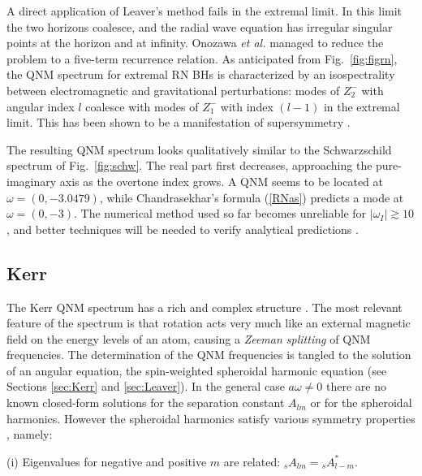 \documentclass[]{iopart}
\begin{document}
A direct application of Leaver's method fails in the extremal limit. In this
limit the two horizons coalesce, and the radial wave equation has irregular
singular points at the horizon and at infinity. Onozawa {\it et al.}
\cite{Onozawa:1995vu} managed to reduce the problem to a five-term recurrence
relation.  As anticipated from Fig.~\ref{fig:figrn}, the QNM spectrum for
extremal RN BHs is characterized by an isospectrality between electromagnetic
and gravitational perturbations: modes of $Z_2^-$ with angular index $l$
coalesce with modes of $Z_1^-$ with index $(l-1)$ in the extremal limit. This
has been shown to be a manifestation of supersymmetry
\cite{Onozawa:1996ba,Okamura:1997ic,Kallosh:1997ug}.

The resulting QNM spectrum \cite{Berti:2004md,Berti:2003zu,Onozawa:1995vu}
looks qualitatively similar to the Schwarzschild spectrum of
Fig.~\ref{fig:schw}.  The real part first decreases, approaching the
pure-imaginary axis as the overtone index grows. A QNM seems to be located at
$\omega=(0,-3.0479)$, while Chandrasekhar's formula (\ref{RNas}) predicts a
mode at $\omega=(0,-3)$.  The numerical method used so far becomes unreliable
for $|\omega_I|\gtrsim 10$, and better techniques will be needed to verify
analytical predictions \cite{Motl:2003cd,Natario:2004jd}.

\subsection{\label{sec:qnmkerr}Kerr}

The Kerr QNM spectrum has a rich and complex structure
\cite{Leaver:1985ax,Onozawa:1996ux,Berti:2003jh,Berti:2004md,Detweiler:1980gk}.
The most relevant feature of the spectrum is that rotation acts very much like
an external magnetic field on the energy levels of an atom, causing a {\it
  Zeeman splitting} of QNM frequencies. The determination of the QNM
frequencies is tangled to the solution of an angular equation, the
spin-weighted spheroidal harmonic equation (see Sections \ref{sec:Kerr} and
\ref{sec:Leaver}).  In the general case $a \omega \neq 0$ there are no known
closed-form solutions for the separation constant $A_{lm}$ or for the
spheroidal harmonics. However the spheroidal harmonics satisfy various
symmetry properties \cite{Berti:2005gp,Leaver:1985ax}, namely:

\noindent (i) Eigenvalues for negative and positive $m$ are related:
${}_sA_{lm}={}_sA_{l-m}^*$.
\end{document}
